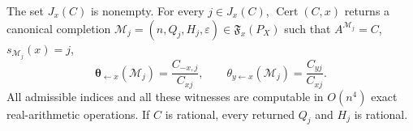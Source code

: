 The set \(J_x(C)\) is nonempty. For every \(j\in J_x(C)\), \(\operatorname{Cert}(C,x)\) returns a canonical completion \(\mathcal M_j=(n,Q_j,H_j,\varepsilon)\in\mathfrak F_x(P_X)\) such that \(A^{\mathcal M_j}=C\), \(s_{\mathcal M_j}(x)=j\),
\[
 \boldsymbol\theta_{\leftarrow x}(\mathcal M_j)=\frac{C_{-x,j}}{C_{xj}},
 \qquad
 \theta_{y\leftarrow x}(\mathcal M_j)=\frac{C_{yj}}{C_{xj}}.
\]
All admissible indices and all these witnesses are computable in \(O(n^4)\) exact real-arithmetic operations. If \(C\) is rational, every returned \(Q_j\) and \(H_j\) is rational.